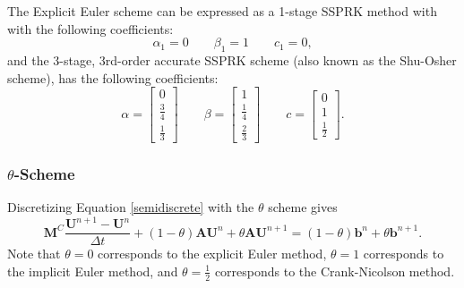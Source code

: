 The Explicit Euler scheme can be expressed as a 1-stage SSPRK method with
with the following coefficients:
\begin{equation}
   \alpha_1 = 0\qquad\beta_1 = 1\qquad c_1 = 0,
\end{equation}
and the 3-stage, 3rd-order accurate SSPRK scheme (also known as the Shu-Osher
scheme), has the following coefficients:
\begin{equation}
   \alpha = \left[\begin{array}{c}0\\\frac{3}{4}\\\frac{1}{3}\end{array}\right]
   \qquad\beta = \left[\begin{array}{c}1\\\frac{1}{4}\\\frac{2}{3}\end{array}\right]
   \qquad c = \left[\begin{array}{c}0\\1\\\frac{1}{2}\end{array}\right].
\end{equation}
\subsubsection{$\theta$-Scheme}\label{theta}
Discretizing Equation \eqref{semidiscrete} with the $\theta$ scheme gives
\begin{equation}\label{thetagalerkin}
  \mathbf{M}^C\frac{\mathbf{U}^{n+1}-\mathbf{U}^n}{\Delta t}
  + (1-\theta)\mathbf{A}\mathbf{U}^n + \theta\mathbf{A}\mathbf{U}^{n+1}
  = (1-\theta)\mathbf{b}^n + \theta\mathbf{b}^{n+1}.
\end{equation}
Note that $\theta=0$ corresponds to the explicit Euler method,
$\theta=1$ corresponds to the implicit Euler method, and $\theta=\frac{1}{2}$
corresponds to the Crank-Nicolson method.

